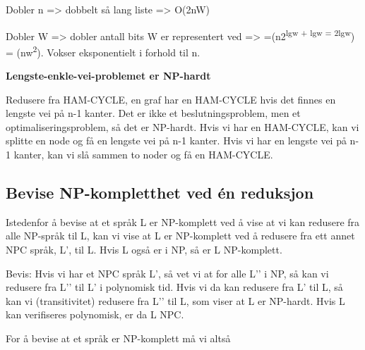 \documentclass[12pt]{report}
\begin{document}
\vspace{\baselineskip}
Dobler n => dobbelt så lang liste => O(2nW)\par

Dobler W => dobler antall bits W er representert ved => =(n2\textsuperscript{lgw + lgw = 2lgw}) = (nw\textsuperscript{2}). Vokser eksponentielt i forhold til n. \par


\vspace{\baselineskip}
\textbf{Lengste-enkle-vei-problemet er NP-hardt}\par

Redusere fra HAM-CYCLE, en graf har en HAM-CYCLE hvis det finnes en lengste vei på n-1 kanter. Det er ikke et beslutningsproblem, men et optimaliseringsproblem, så det er NP-hardt. Hvis vi har en HAM-CYCLE, kan vi splitte en node og få en lengste vei på n-1 kanter. Hvis vi har en lengste vei på n-1 kanter, kan vi slå sammen to noder og få en HAM-CYCLE. \par


\vspace{\baselineskip}
\setlength{\parskip}{10.56pt}

\vspace{\baselineskip}
\subsection*{Bevise NP-kompletthet ved én reduksjon}
Istedenfor å bevise at et språk L er NP-komplett ved å vise at vi kan redusere fra alle NP-språk til L, kan vi vise at L er NP-komplett ved å redusere fra ett annet NPC språk, L’, til L. Hvis L også er i NP, så er L NP-komplett. \par


\vspace{\baselineskip}
Bevis: Hvis vi har et NPC språk L’, så vet vi at for alle L’’ i NP, så kan vi redusere fra L’’ til L’ i polynomisk tid. Hvis vi da kan redusere fra L’ til L, så kan vi (transitivitet) redusere fra L’’ til L, som viser at L er NP-hardt. Hvis L kan verifiseres polynomisk, er da L NPC.\par


\vspace{\baselineskip}
For å bevise at et språk er NP-komplett må vi altså\par
\end{document}
